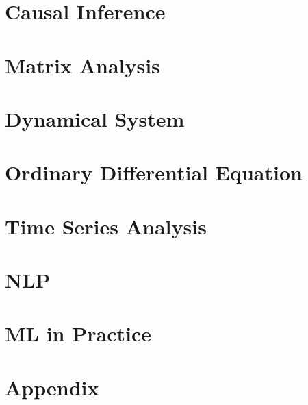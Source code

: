 \documentclass{article}
\begin{document}
\section{Causal Inference}


\section{Matrix Analysis}


\section{Dynamical System}


\section{Ordinary Differential Equation}



\section{Time Series Analysis}



\section{NLP}


\section{ML in Practice}



\section{Appendix}





\end{document}
